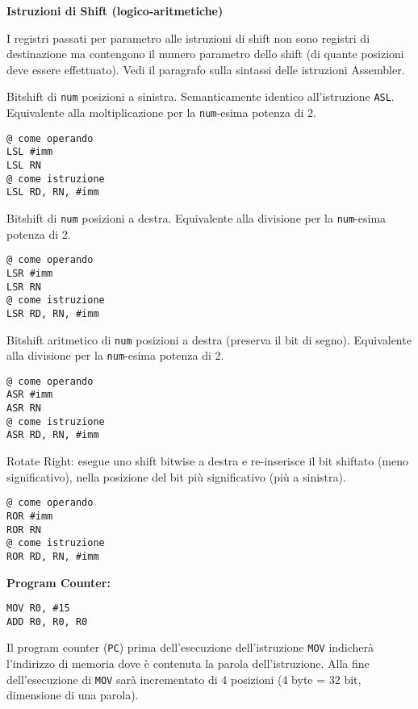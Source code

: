 \begin{defn}
\textbf{Istruzioni di Shift (logico-aritmetiche)}

\begin{note}
	I registri passati per parametro alle istruzioni di shift non sono registri di destinazione ma contengono il numero parametro dello shift (di quante posizioni deve essere effettuato). Vedi il paragrafo sulla sintassi delle istruzioni Assembler.
\end{note}

Bitshift di \verb|num| posizioni a sinistra. Semanticamente identico all'istruzione \verb|ASL|. Equivalente alla moltiplicazione per la \verb|num|-esima potenza di 2.
\begin{lstlisting}[style=arm]
@ come operando
LSL #imm
LSL RN
@ come istruzione
LSL RD, RN, #imm
\end{lstlisting}

Bitshift di \verb|num| posizioni a destra. Equivalente alla divisione per la \verb|num|-esima potenza di 2.
\begin{lstlisting}[style=arm]
@ come operando
LSR #imm
LSR RN
@ come istruzione
LSR RD, RN, #imm
\end{lstlisting}


Bitshift aritmetico di \verb|num| posizioni a destra (preserva il bit di segno). Equivalente alla divisione per la \verb|num|-esima potenza di 2.
\begin{lstlisting}[style=arm]
@ come operando
ASR #imm
ASR RN
@ come istruzione
ASR RD, RN, #imm
\end{lstlisting}



Rotate Right: esegue uno shift bitwise a destra e re-inserisce il bit shiftato (meno significativo), nella posizione del bit più significativo (più a sinistra).
\begin{lstlisting}[style=arm]
@ come operando
ROR #imm
ROR RN
@ come istruzione
ROR RD, RN, #imm
\end{lstlisting}

\end{defn}


\begin{exmp}
\textbf{Program Counter:}


\begin{lstlisting}[style=arm]
MOV R0, #15
ADD R0, R0, R0
\end{lstlisting}


Il program counter (\verb|PC|) prima dell'esecuzione dell'istruzione \verb|MOV| indicherà l'indirizzo di memoria dove è contenuta la parola dell'istruzione. Alla fine dell'esecuzione di \verb|MOV| sarà incrementato di 4 posizioni (4 byte = 32 bit, dimensione di una parola).
\end{exmp}

